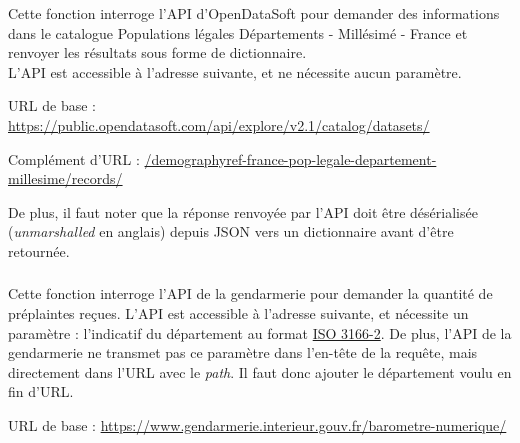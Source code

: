 \noindent Cette fonction interroge l'API d'OpenDataSoft pour demander des informations dans le catalogue \og Populations légales Départements - Millésimé - France \fg{} et renvoyer les résultats sous forme de dictionnaire.\\
L'API est accessible à l'adresse suivante, et ne nécessite aucun paramètre.

\noindent URL de base : \url{https://public.opendatasoft.com/api/explore/v2.1/catalog/datasets/}

\noindent Complément d'URL : \url{/demographyref-france-pop-legale-departement-millesime/records/}

\medskip

%
%

\noindent De plus, il faut noter que la réponse renvoyée par l'API doit être désérialisée (\textit{unmarshalled} en anglais) depuis JSON vers un dictionnaire avant d'être retournée.


\subsubsection*{}

\noindent Cette fonction interroge l'API de la gendarmerie pour demander la quantité de préplaintes reçues.
L'API est accessible à l'adresse suivante, et nécessite un paramètre : l'indicatif du département au format \href{https://fr.wikipedia.org/wiki/ISO_3166-2:FR}{ISO 3166-2}.
De plus, l'API de la gendarmerie ne transmet pas ce paramètre dans l'en-tête de la requête, mais directement dans l'URL avec le \textit{path}.
Il faut donc ajouter le département voulu en fin d'URL.

\noindent URL de base : \url{https://www.gendarmerie.interieur.gouv.fr/barometre-numerique/}

